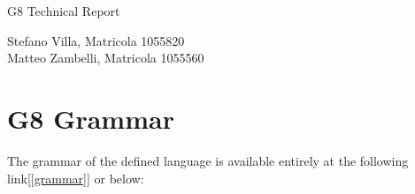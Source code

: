 \documentclass[a4paper]{article}
\begin{document}
\vspace{3\baselineskip}

\begin{center}
\begin{Huge}
G8 Technical Report
\end{Huge}
\end{center}

\vspace{3\baselineskip}

\begin{Large}
\begin{center}
Stefano Villa, Matricola 1055820\\
Matteo Zambelli, Matricola 1055560
\end{center}
\end{Large}

\newpage
\tableofcontents
\newpage

\section{G8 Grammar}


The grammar of the defined language is available entirely at the following link[\ref{grammar}] or below:
\end{document}
